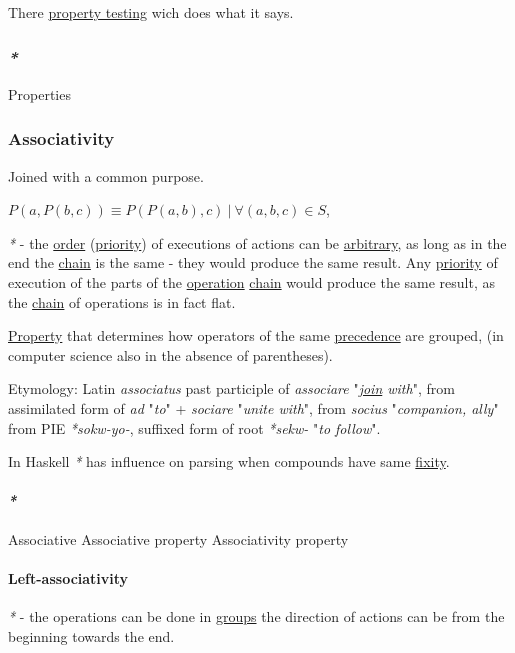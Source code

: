 \documentclass[a4paper,14pt,oneside]{book}
\begin{document}
There \hyperref[org97132f1]{property testing} wich does what it says.

\subsubsection{\emph{*}}
\label{sec:orgf31be26}

\label{orgcc131cf}Properties

\subsubsection{\label{orgaec8df2}Associativity}
\label{sec:orgb16a840}
Joined with a common purpose.

\(P(a,P(b,c)) \equiv P(P(a,b),c) \ | \ \forall (a,b,c) \in S\),

\emph{*} - the \hyperref[orgc85fb35]{order} (\hyperref[org688cc34]{priority}) of executions of actions can be \hyperref[org5531eb4]{arbitrary}, as long as in the end the \hyperref[org50678a2]{chain} is the same - they would produce the same result.
Any \hyperref[org688cc34]{priority} of execution of the parts of the \hyperref[orgc63469e]{operation} \hyperref[org50678a2]{chain} would produce the same result, as the \hyperref[org50678a2]{chain} of operations is in fact flat.

\hyperref[orgb6e81ca]{Property} that determines how operators of the same \hyperref[orgbb17a90]{precedence} are grouped, (in computer science also in the absence of parentheses).

Etymology:
Latin \emph{associatus} past participle of \emph{associare} "\emph{\hyperref[org167a31a]{join} with}", from assimilated form of \emph{ad} "\emph{to}" + \emph{sociare} "\emph{unite with}", from \emph{socius} "\emph{companion, ally}" from PIE \emph{*sokw-yo-}, suffixed form of root \emph{*sekw-} "\emph{to follow}".

In Haskell \emph{*} has influence on parsing when compounds have same \hyperref[orgdbece8e]{fixity}.

\paragraph{\emph{*}}
\label{sec:orgdd7c993}

\label{orgcf2a646}Associative
\label{orgceecc97}Associative property
\label{org4574f80}Associativity property

\paragraph{\label{orgf739bba}Left-associativity}
\label{sec:orgc86505d}
\emph{*} - the operations can be done in \hyperref[orgaaa97ce]{groups} the direction of actions can be from the beginning towards the end.
\end{document}
